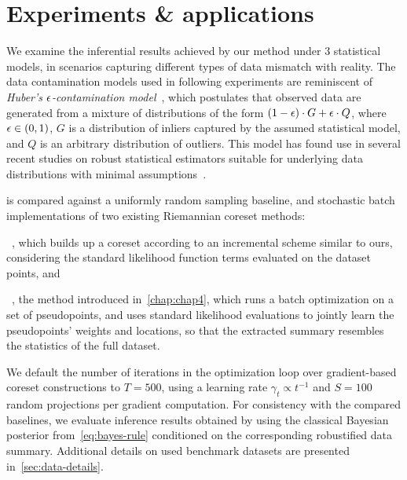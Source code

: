 \section{Experiments \& applications}
\label{sec:evaluation}
\newcommand{\MYhref}[3][mydarkblue]{\href{#2}{\color{#1}{#3}}}%

We examine the inferential results achieved by our method under 3 statistical models, in scenarios capturing different types of data mismatch with reality. The data contamination models used in following experiments are reminiscent of \emph{Huber's $\epsilon$-contamination model}~\citep{huber92}, which postulates that observed data are generated from a mixture of distributions of the form $(1-\epsilon)\cdot G+ \epsilon\cdot Q$, where $\epsilon \in (0,1)$,  $G$ is a distribution of inliers captured by the assumed statistical model, and $Q$ is an arbitrary distribution of outliers. This model has found use in several recent studies on robust statistical estimators suitable for underlying data distributions with minimal assumptions~\citep{wei17, chen18}.

\bcores{} is compared against a uniformly random sampling baseline, and stochastic batch implementations of two existing Riemannian coreset methods: 
\benum[label={(\roman*)}]
	\item \sparsevi~\citep{campbell19neurips}, which builds up a coreset according to an incremental scheme similar to ours, considering the standard likelihood function terms evaluated on the dataset points, and 
	\item \psvi~\citep{psvi}, the method introduced in~\cref{chap:chap4}, which runs a batch optimization on a set of pseudopoints, and uses standard likelihood evaluations to jointly learn the pseudopoints' weights and locations, so that the extracted summary resembles the statistics of the full dataset. 
\eenum


We default the number of iterations in the optimization loop over gradient-based coreset constructions to $ T = 500$, using a learning rate $ \gamma_t \propto t^{-1}$ and $S=100$ random projections per gradient computation. For consistency with the compared baselines, we evaluate inference results obtained by \bcores{} using the classical Bayesian posterior from~\cref{eq:bayes-rule} conditioned on the corresponding robustified data summary. Additional details on used benchmark datasets are presented in~\cref{sec:data-details}. 

